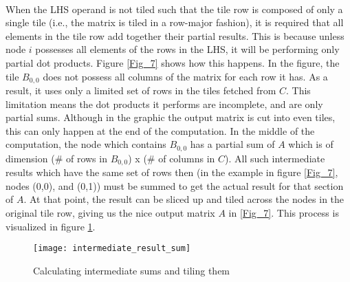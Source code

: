 \paragraph{}
When the LHS operand is not tiled such that the tile row is composed of only a single tile (i.e., the matrix is tiled in a row-major fashion), it is required that all elements in the tile row add together their partial results. This is because unless node $i$ possesses all elements of the rows in the LHS, it will be performing only partial dot products. Figure \ref{Fig_7} shows how this happens. In the figure, the tile $B_{0,0}$ does not possess all columns of the matrix for each row it has. As a result, it uses only a limited set of rows in the tiles fetched from $C$. This limitation means the dot products it performs are incomplete, and are only partial sums. Although in the graphic the output matrix is cut into even tiles, this can only happen at the end of the computation. In the middle of the computation, the node which contains $B_{0,0}$ has a partial sum of $A$ which is of dimension (\# of rows in $B_{0,0}$) x (\# of columns in $C$). All such intermediate results which have the same set of rows then (in the example in figure \ref{Fig_7}, nodes (0,0), and (0,1)) must be summed to get the actual result for that section of $A$. At that point, the result can be sliced up and tiled across the nodes in the original tile row, giving us the nice output matrix $A$ in \ref{Fig_7}. This process is visualized in figure \ref{int_sum}.


\begin{figure}
	\centering
	\texttt{[image: intermediate\_result\_sum]}
	\caption{Calculating intermediate sums and tiling them}
	\label{int_sum}
\end{figure}


